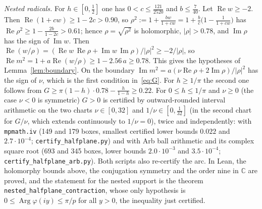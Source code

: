 \documentclass[10pt,a4paper]{article}
\theoremstyle{plain}
\theoremstyle{remark}
\numberwithin{equation}{section}
\newcommand{\C}{\mathbb{C}}\newcommand{\R}{\mathbb{R}}\newcommand{\Hp}{\mathbb{H}}
\DeclareMathOperator{\re}{Re}\DeclareMathOperator{\im}{Im}
\DeclareMathOperator{\Arg}{Arg}\DeclareMathOperator{\Log}{Log}
\newcommand{\lean}[1]{\texttt{#1}}
\begin{document}
\emph{Nested radicals.} For $h\in[0,\frac12]$ one has $0<c\le\frac{121}{2520}$ and
$b\le\frac{7}{40}$. Let $\re w\ge-2$. Then $\re(1+cw)\ge1-2c>0.90$, so
$\rho^{2}:=1+\frac{bw}{1+cw}=1+\frac bc\bigl(1-\frac1{1+cw}\bigr)$ has
$\re\rho^{2}\ge1-\frac{2b}{1-2c}>0.61$; hence $\rho=\sqrt{\rho^{2}}$ is holomorphic, $|\rho|>0.78$,
and $\im\rho$ has the sign of $\im w$. Then $\re(w/\rho)=(\re w\,\re\rho+\im w\,\im\rho)/|\rho|^{2}
\ge-2/|\rho|$, so $\re m^{2}=1+a\re(w/\rho)\ge1-2.56\,a\ge0.78$. This gives the hypotheses of
Lemma~\ref{lem:boundary}. On the boundary $\im m^{2}=a(\nu\re\rho+2\im\rho)/|\rho|^{2}$ has the sign
of $\nu$, which is the first condition in~\eqref{eq:G}. For $h\ge1/\pi$ the second one follows from
$G\ge\pi(1-h)\cdot0.78-\frac h{1-h}\ge0.22$. For $0\le h\le1/\pi$ and $\nu\ge0$ (the case $\nu<0$ is
symmetric) $G>0$ is certified by outward-rounded interval arithmetic on the two charts
$\nu\in[0,32]$ and $1/\nu\in[0,\frac1{32}]$ (in the second chart for $G/\nu$, which extends
continuously to $1/\nu=0$), twice and independently: with \texttt{mpmath.iv} (149 and 179 boxes,
smallest certified lower bounds $0.022$ and $2.7\cdot10^{-4}$; \texttt{certify\_halfplane.py}) and
with Arb ball arithmetic and its complex square root (693 and 345 boxes, lower bounds
$2.0\cdot10^{-3}$ and $3.5\cdot10^{-4}$; \texttt{certify\_halfplane\_arb.py}). Both scripts also
re-certify the arc. In Lean, the holomorphy bounds above, the conjugation symmetry and the order
nine in $\C$ are proved, and the statement for the nested support is the theorem
\lean{nested\_halfplane\_contraction}, whose only hypothesis is
$0\le\Arg\varphi(iy)\le\pi/p$ for all $y>0$, the inequality just certified.
\end{document}
